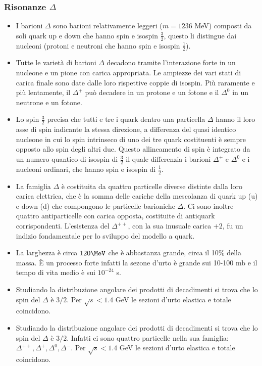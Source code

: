 \subsubsection{Risonanze $\Delta$}
\begin{itemize}
\item I barioni $\Delta$ sono barioni relativamente leggeri ($m = 1236$ MeV) composti da soli quark up e down che hanno spin e isospin $\frac32$, questo li distingue dai nucleoni (protoni e neutroni che hanno spin e isospin $\frac {1}{2}$). 
\item Tutte le varietà di barioni $\Delta$ decadono tramite l'interazione forte in un nucleone e un pione con carica appropriata. Le ampiezze dei vari stati di carica finale sono date dalle loro rispettive coppie di isospin. Più raramente e più lentamente, il $\Delta^+$ può decadere in un protone e un fotone e il $\Delta^0$ in un neutrone e un fotone. 
\item Lo spin $\frac32$ precisa che tutti e tre i quark dentro una particella $\Delta$ hanno il loro asse di spin indicante la stessa direzione, a differenza del quasi identico nucleone in cui lo spin intrinseco di uno dei tre quark costituenti è sempre opposto allo spin degli altri due. Questo allineamento di spin è integrato da un numero quantico di isospin di $\frac32$ il quale differenzia i barioni $\Delta^+$ e $\Delta^0$ e i nucleoni ordinari, che hanno spin e isospin di $\frac12$.
\item La famiglia $\Delta$ è costituita da quattro particelle diverse distinte dalla loro carica elettrica, che è la somma delle cariche della mescolanza di quark up (u) e down (d) che compongono le particelle barioniche $\Delta$. Ci sono inoltre quattro antiparticelle con carica opposta, costituite di antiquark corrispondenti. L'esistenza del $\Delta^{++}$, con la sua inusuale carica $+2$, fu un indizio fondamentale per lo sviluppo del modello a quark. 
\item La larghezza è circa $120\MeV$ che è abbastanza grande, circa il 10\% della massa. È un processo forte infatti la sezone d'urto è grande sui 10-100 mb e il tempo di vita medio è sui $10^{-24}$ s. 
\item Studiando la distribuzione angolare dei prodotti di decadimenti si trova che lo spin del $\Delta$ è $3/2$. Per $\sqrt s<1.4$ GeV le sezioni d'urto elastica e totale coincidono.
\item Studiando la distribuzione angolare dei prodotti di decadimenti si trova che lo spin del $\Delta$ è $3/2$. Infatti ci sono quattro particelle nella sua famiglia: $\Delta^{++},\Delta^+,\Delta^{0},\Delta^{-}$. Per $\sqrt s<1.4$ GeV le sezioni d'urto elastica e totale coincidono. 

\end{itemize}
